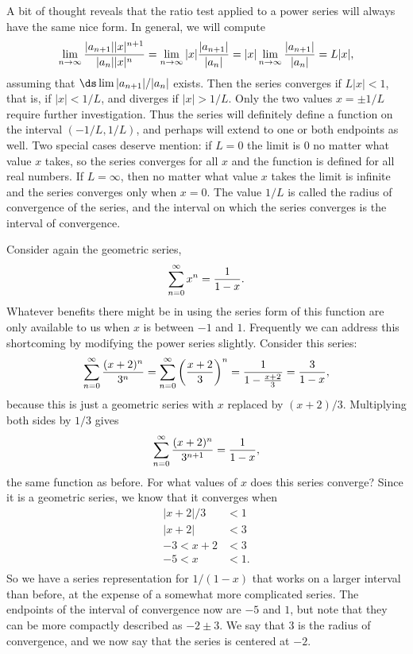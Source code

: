 A bit of thought reveals that the ratio test applied to a power series
will always have the same nice form. In general, we will compute
$$
  \lim_{n\to\infty} {|a_{n+1}||x|^{n+1}\over |a_n||x|^n}
  =\lim_{n\to\infty} |x|{|a_{n+1}|\over |a_n|} =
  |x|\lim_{n\to\infty} {|a_{n+1}|\over |a_n|} =L|x|,
$$
assuming that $\ds \lim |a_{n+1}|/|a_n|$ exists. Then the series
converges if $L|x|<1$, that is, if $|x|<1/L$, and diverges if
$|x|>1/L$. Only the two values $x=\pm1/L$ require further
investigation. Thus the series will definitely define a function on
the interval $(-1/L,1/L)$, and perhaps will extend to one or both
endpoints as well. Two special cases deserve mention: if $L=0$ the
limit is $0$ no matter what value $x$ takes, so the series converges
for all $x$ and the function is defined for all real numbers. If
$L=\infty$, then no matter what value $x$ takes the limit is infinite
and the series converges only when $x=0$. The value $1/L$ is called
the {\dfont radius of convergence%
\/} of the series, and the
interval on which the series converges is the {\dfont interval of
convergence}.

Consider again the geometric series,
$$\sum_{n=0}^\infty x^n={1\over 1-x}.$$
Whatever benefits there might be in using the series form of this
function are only available to us when $x$ is between $-1$ and
$1$. Frequently we can address this shortcoming by modifying the power
series slightly. Consider this series:
$$
  \sum_{n=0}^\infty {(x+2)^n\over 3^n}=
  \sum_{n=0}^\infty \left({x+2\over 3}\right)^n={1\over 1-{x+2\over 3}}=
  {3\over 1-x},
$$
because this is just a geometric series with $x$ replaced by
$(x+2)/3$. Multiplying both sides by $1/3$ 
gives
$$\sum_{n=0}^\infty {(x+2)^n\over 3^{n+1}}={1\over 1-x},$$
the same function as before. For what values of $x$ does this series
converge? Since it is a geometric series, we know that it converges
when 
\begin{align*}
  |x+2|/3&<1 \\
  |x+2|&<3 \\
  -3 < x+2 &< 3 \\
  -5<x&<1. \\
\end{align*}
So we have a series representation for $1/(1-x)$ that works on a
larger interval than before, at the expense of a somewhat more
complicated series. The endpoints of the interval of convergence now
are $-5$ and $1$, but note that they can be more compactly described
as $-2\pm3$. We say that $3$ is the radius of convergence, and
we now say that the series is centered at $-2$.

